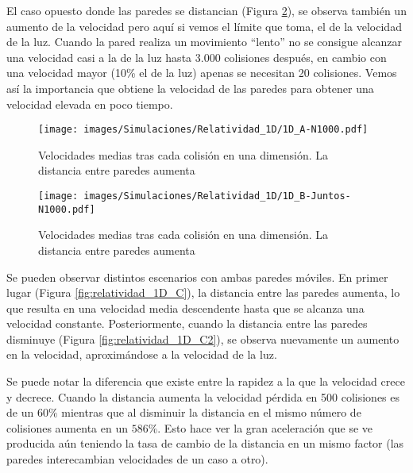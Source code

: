\documentclass[11pt, spanish]{book}
\begin{document}
\vspace{3mm}

El caso opuesto donde las paredes se distancian (Figura \ref{fig:relatividad_1D_B}), se observa también un aumento de la velocidad pero aquí si vemos el límite que toma, el de la velocidad de la luz. Cuando la pared realiza un movimiento ``lento'' no se consigue alcanzar una velocidad casi a la de la luz hasta 3.000 colisiones después, en cambio con una velocidad mayor (10\% el de la luz) apenas se necesitan 20 colisiones. Vemos así la importancia que obtiene la velocidad de las paredes para obtener una velocidad elevada en poco tiempo.

\vspace{3mm}

\begin{figure}[H]
    \centering
    \texttt{[image: images/Simulaciones/Relatividad\_1D/1D\_A-N1000.pdf]}
    \caption{Velocidades medias tras cada colisión en una dimensión. La distancia entre paredes aumenta}
    \label{fig:relatividad_1D_A}
\end{figure}

\begin{figure}[H]
    \centering
    \texttt{[image: images/Simulaciones/Relatividad\_1D/1D\_B-Juntos-N1000.pdf]}
    \caption{Velocidades medias tras cada colisión en una dimensión. La distancia entre paredes aumenta}
    \label{fig:relatividad_1D_B}
\end{figure}

Se pueden observar distintos escenarios con ambas paredes móviles. En primer lugar (Figura \ref{fig:relatividad_1D_C}), la distancia entre las paredes aumenta, lo que resulta en una velocidad media descendente hasta que se alcanza una velocidad constante. Posteriormente, cuando la distancia entre las paredes disminuye (Figura \ref{fig:relatividad_1D_C2}), se observa nuevamente un aumento en la velocidad, aproximándose a la velocidad de la luz.

\vspace{3mm}

Se puede notar la diferencia que existe entre la rapidez a la que la velocidad crece y decrece. Cuando la distancia aumenta la velocidad pérdida en 500 colisiones es de un \( 60\% \) mientras que al disminuir la distancia en el mismo número de colisiones aumenta en un \( 586\% \). Esto hace ver la gran aceleración que se ve producida aún teniendo la tasa de cambio de la distancia en un mismo factor (las paredes interecambian velocidades de un caso a otro).
\end{document}
